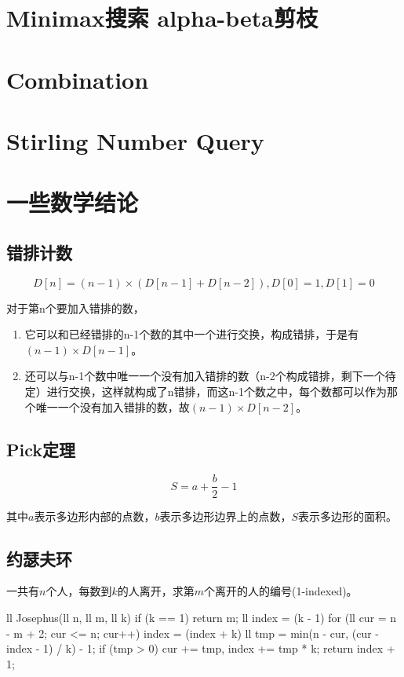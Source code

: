 \section{Minimax搜索 alpha-beta剪枝}

\section{Combination}

\section{Stirling Number Query}

\section{一些数学结论}
\subsection{错排计数}
$$D[n] = (n-1)\times(D[n-1]+D[n-2]), D[0] = 1, D[1] = 0$$

对于第n个要加入错排的数，
\begin{enumerate}
  \item 它可以和已经错排的n-1个数的其中一个进行交换，构成错排，于是有 $(n-1)\times D[n-1]$。
  \item 还可以与n-1个数中唯一一个没有加入错排的数（n-2个构成错排，剩下一个待定）进行交换，这样就构成了n错排，而这n-1个数之中，每个数都可以作为那个唯一一个没有加入错排的数，故$(n-1)\times D[n-2]$。
\end{enumerate}

\subsection{Pick定理}
$$S=a+\frac{b}{2}-1$$

其中$a$表示多边形内部的点数，$b$表示多边形边界上的点数，$S$表示多边形的面积。

\subsection{约瑟夫环}
一共有$n$个人，每数到$k$的人离开，求第$m$个离开的人的编号(1-indexed)。
\begin{cpplist}
ll Josephus(ll n, ll m, ll k) {
  if (k == 1) return m;
  ll index = (k - 1) %
  for (ll cur = n - m + 2; cur <= n; cur++) {
    index = (index + k) %
    ll tmp = min(n - cur, (cur - index - 1) / k) - 1;
    if (tmp > 0) cur += tmp, index += tmp * k;
  }
  return index + 1;
}
\end{cpplist}